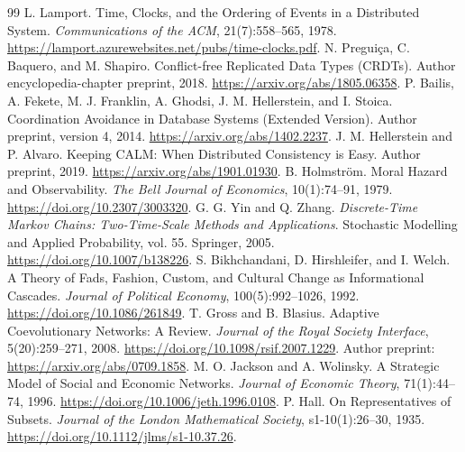 \documentclass[11pt,letterpaper]{article}
\theoremstyle{plain}
\theoremstyle{definition}
\theoremstyle{remark}
\begin{document}
\begin{thebibliography}{99}
 L. Lamport. Time, Clocks, and the Ordering of Events in a Distributed System. \emph{Communications of the ACM}, 21(7):558--565, 1978. \url{https://lamport.azurewebsites.net/pubs/time-clocks.pdf}.
 N. Pregui\c{c}a, C. Baquero, and M. Shapiro. Conflict-free Replicated Data Types (CRDTs). Author encyclopedia-chapter preprint, 2018. \url{https://arxiv.org/abs/1805.06358}.
 P. Bailis, A. Fekete, M. J. Franklin, A. Ghodsi, J. M. Hellerstein, and I. Stoica. Coordination Avoidance in Database Systems (Extended Version). Author preprint, version 4, 2014. \url{https://arxiv.org/abs/1402.2237}.
 J. M. Hellerstein and P. Alvaro. Keeping CALM: When Distributed Consistency is Easy. Author preprint, 2019. \url{https://arxiv.org/abs/1901.01930}.
 B. Holmstr\"om. Moral Hazard and Observability. \emph{The Bell Journal of Economics}, 10(1):74--91, 1979. \url{https://doi.org/10.2307/3003320}.
 G. G. Yin and Q. Zhang. \emph{Discrete-Time Markov Chains: Two-Time-Scale Methods and Applications}. Stochastic Modelling and Applied Probability, vol. 55. Springer, 2005. \url{https://doi.org/10.1007/b138226}.
 S. Bikhchandani, D. Hirshleifer, and I. Welch. A Theory of Fads, Fashion, Custom, and Cultural Change as Informational Cascades. \emph{Journal of Political Economy}, 100(5):992--1026, 1992. \url{https://doi.org/10.1086/261849}.
 T. Gross and B. Blasius. Adaptive Coevolutionary Networks: A Review. \emph{Journal of the Royal Society Interface}, 5(20):259--271, 2008. \url{https://doi.org/10.1098/rsif.2007.1229}. Author preprint: \url{https://arxiv.org/abs/0709.1858}.
 M. O. Jackson and A. Wolinsky. A Strategic Model of Social and Economic Networks. \emph{Journal of Economic Theory}, 71(1):44--74, 1996. \url{https://doi.org/10.1006/jeth.1996.0108}.
 P. Hall. On Representatives of Subsets. \emph{Journal of the London Mathematical Society}, s1-10(1):26--30, 1935. \url{https://doi.org/10.1112/jlms/s1-10.37.26}.

\end{thebibliography}
\end{document}
